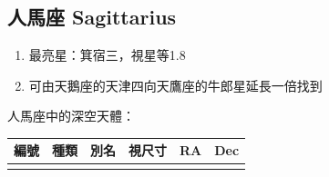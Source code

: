 \subsection{人馬座 Sagittarius}
\begin{enumerate}
    \item 最亮星：箕宿三，視星等1.8
    \item 可由天鵝座的天津四向天鷹座的牛郎星延長一倍找到
\end{enumerate}
人馬座中的深空天體：
\newline

\begin{center}
\begin{longtable}{c | c | c | c | c | c}
    編號 & 種類 & 別名 & 視尺寸 & RA & Dec \\
    \hline
    \endfirsthead


    \endfoot

    \endlastfoot


\end{longtable}
\end{center}
